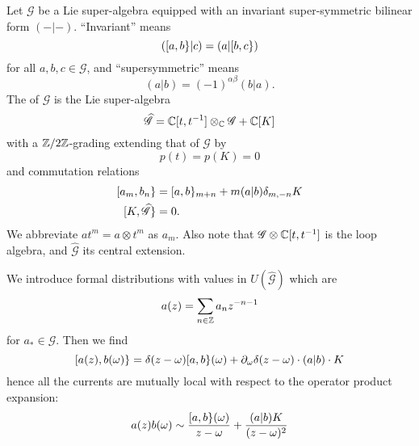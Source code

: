 \M
Let $\mathscr{G}$ be a Lie super-algebra equipped with an invariant
super-symmetric bilinear form $(-|-)$. ``Invariant'' means
\begin{equation}
([a,b\}|c)=(a|[b,c\})
\end{equation}
for all $a,b,c\in\mathscr{G}$, and ``supersymmetric'' means
\begin{equation}
(a|b)=(-1)^{\alpha\beta}(b|a).
\end{equation}
The  of $\mathscr{G}$ is the Lie super-algebra
\begin{equation}
\widehat{\mathscr{G}}=\mathbb{C}[t,t^{-1}]\otimes_{\mathbb{C}}\mathscr{G}+\mathbb{C}[K]
\end{equation}
with a $\mathbb{Z}/2\mathbb{Z}$-grading extending that of $\mathscr{G}$ by
\begin{equation}
p(t)=p(K)=0
\end{equation}
and commutation relations
\begin{equation}
\begin{split}
\superb{a_m}{b_n} &= \superb{a}{b}_{m+n}+m(a|b)\delta_{m,-n}K\\
\superb{K}{\widehat{\mathscr{G}}}&=0.
\end{split}
\end{equation}
We abbreviate $at^{m}=a\otimes t^{m}$ as $a_{m}$. Also note that
$\mathscr{G}\otimes\mathbb{C}[t,t^{-1}]$ is the loop algebra, and
$\widehat{\mathscr{G}}$ its central extension.

\M
We introduce formal distributions with values in
$U(\widehat{\mathscr{G}})$ which are 
\begin{equation}
a(z)=\sum_{n\in\mathbb{Z}}a_{n}z^{-n-1}
\end{equation}
for $a_{*}\in\mathscr{G}$. Then we find
\begin{equation}
[a(z),b(\omega)\} = 
\delta(z-\omega)[a,b\}(\omega) + \partial_{\omega}\delta(z-\omega)\cdot(a|b)\cdot{K}
\end{equation}
hence all the currents are mutually local with respect to the operator
product expansion:
\begin{equation}
a(z)b(\omega)\sim\frac{[a,b\}(\omega)}{z-\omega}+\frac{(a|b)K}{(z-\omega)^{2}}
\end{equation}

